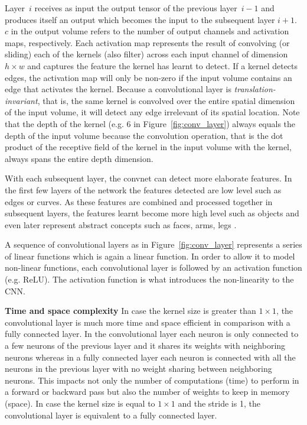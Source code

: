 \documentclass[12pt,a4paper]{article}
\begin{document}
Layer~$i$ receives as input the output tensor of the previous layer~$i-1$ and produces itself an output which becomes the input to the subsequent layer $i+1$. $c$ in the output volume refers to the number of output channels and activation maps, respectively. Each activation map represents the result of convolving (or sliding) each of the kernels (also filter) across each input channel of dimension $h \times w$ and captures the feature the kernel has learnt to detect. If a kernel detects edges, the activation map will only be non-zero if the input volume contains an edge that activates the kernel. Because a convolutional layer is \textit{translation-invariant}, that is, the same kernel is convolved over the entire spatial dimension of the input volume, it will detect any edge irrelevant of its spatial location. Note that the depth of the kernel (e.g. 6 in Figure~\ref{fig:conv_layer}) always equals the depth of the input volume because the convolution operation, that is the dot product of the receptive field of the kernel in the input volume with the kernel, always spans the entire depth dimension. 

With each subsequent layer, the convnet can detect more elaborate features. In the first few layers of the network the features detected are low level such as edges or curves. As these features are combined and processed together in subsequent layers, the features learnt become more high level such as objects and even later represent abstract concepts such as faces, arms, legs \cite{DeepVis}.

A sequence of convolutional layers as in Figure~\ref{fig:conv_layer} represents a series of linear functions which is again a linear function. In order to allow it to model non-linear functions, each convolutional layer is followed by an activation function (e.g. ReLU). The activation function is what introduces the non-linearity to the CNN.

\textbf{Time and space complexity} In case the kernel size is greater than $1 \times 1$, the convolutional layer is much more time and space efficient in comparison with a fully connected layer. In the convolutional layer each neuron is only connected to a few neurons of the previous layer and it shares its weights with neighboring neurons whereas in a fully connected layer each neuron is connected with all the neurons in the previous layer with no weight sharing between neighboring neurons. This impacts not only the number of computations (time) to perform in a forward or backward pass but also the number of weights to keep in memory (space). In case the kernel size is equal to $1 \times 1$ and the stride is 1, the convolutional layer is equivalent to a fully connected layer.
\end{document}
